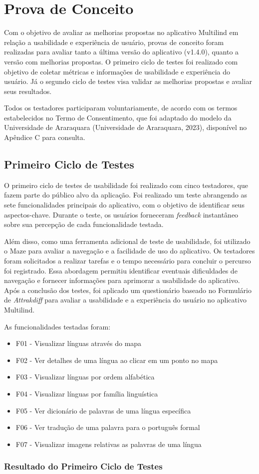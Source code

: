 \section{Prova de Conceito}
\label{sec:Prova de Conceito}
Com o objetivo de avaliar as melhorias propostas no aplicativo Multilind em relação a usabilidade e experiência de usuário, provas de conceito foram 
realizadas para avaliar tanto a última versão do aplicativo (v1.4.0), quanto a versão com melhorias propostas. O primeiro ciclo de testes foi realizado 
com objetivo de coletar métricas e informações de usabilidade e experiência do usuário. Já o segundo ciclo de testes visa validar as melhorias propostas e avaliar seus resultados.

Todos os testadores participaram voluntariamente, de acordo com os termos estabelecidos no Termo de Consentimento, que foi adaptado do 
modelo da Universidade de Araraquara (Universidade de Araraquara, 2023), disponível no Apêndice C para consulta.

\subsection{Primeiro Ciclo de Testes}
\label{sec:Primeiro Ciclo}
O primeiro ciclo de testes de usabilidade foi realizado com cinco testadores, que fazem parte do público alvo da aplicação. Foi realizado um teste abrangendo as sete funcionalidades 
principais do aplicativo, com o objetivo de identificar seus aspectos-chave. Durante o teste, os usuários forneceram \textit{feedback} instantâneo sobre sua percepção de cada funcionalidade testada. 

Além disso, como uma ferramenta adicional de teste de usabilidade, foi utilizado o Maze para avaliar a navegação e a facilidade de uso do aplicativo. Os testadores foram solicitados a realizar  
tarefas e o tempo necessário para concluir o percurso foi registrado. Essa abordagem permitiu identificar eventuais dificuldades de navegação e fornecer informações para aprimorar a usabilidade do aplicativo.
Após a conclusão dos testes, foi aplicado um questionário baseado no Formulário de \textit{Attrakdiff} para avaliar a usabilidade e a experiência do usuário no aplicativo Multilind.

\begin{description}
    \item As funcionalidades testadas foram:
	\begin{itemize}
		\item F01 - Visualizar línguas através do mapa
		\item F02 - Ver detalhes de uma língua ao clicar em um ponto no mapa
		\item F03 - Visualizar línguas por ordem alfabética
		\item F04 - Visualizar línguas por família linguística
		\item F05 - Ver dicionário de palavras de uma língua específica
		\item F06 - Ver tradução de uma palavra para o português formal
		\item F07 - Visualizar imagens relativas as palavras de uma língua
	\end{itemize}
\end{description}

\subsubsection{Resultado do Primeiro Ciclo de Testes}
\label{sec:Resultado do Primeiro Ciclo de Testes}
